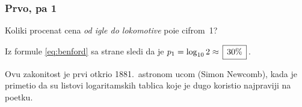\subsubsection{Prvo, pa 1}

\def\fibonacci#1#2#3{%
\newcount\o \o=#1
\newcount\t \t=#2
\number\o,~\number\t
\newcount\f
\newcount\n \n=#3 \advance\n-2
\loop
  \f=\t \advance\t\o \o=\f
  , \number\t
  \advance \n -1
\ifnum \n>0 \repeat}

\zadatak 
Koliki procenat cena {\sl od igle do lokomotive\/}
po{\cv}i{\nj}e cifrom~1?

\resenje Iz formule \eqref{eq:benford} sa strane \pageref{eq:benford} sledi da je $p_1=\logten 2 \approx \ram{30\%}$.

\dodatak Ovu zakonitost je prvi otkrio 1881.\ astronom {\Nj}ucom (Simon Newcomb), kada je primetio da su
listovi logaritamskih tablica koje je dugo koristio najpr{\lj}aviji na po{\cv}etku.
